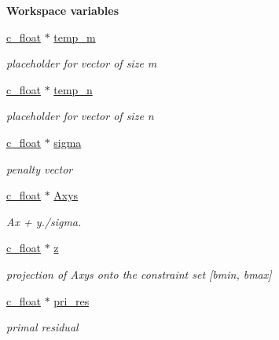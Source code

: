 \begin{Indent}\textbf{ Workspace variables}\par
\begin{DoxyCompactItemize}
\item 
\mbox{\hyperlink{global__opts_8h_a7f1a9fda95e52979658c20a0d134fb15}{c\+\_\+float}} $\ast$ \mbox{\hyperlink{structQPALMWorkspace_a43fba7da6d00e0f05d8ee75b5329f364}{temp\+\_\+m}}
\begin{DoxyCompactList}\small\item\em placeholder for vector of size m \end{DoxyCompactList}\item 
\mbox{\hyperlink{global__opts_8h_a7f1a9fda95e52979658c20a0d134fb15}{c\+\_\+float}} $\ast$ \mbox{\hyperlink{structQPALMWorkspace_af54ff24e9b647dd2d8e8df2b89c11946}{temp\+\_\+n}}
\begin{DoxyCompactList}\small\item\em placeholder for vector of size n \end{DoxyCompactList}\item 
\mbox{\hyperlink{global__opts_8h_a7f1a9fda95e52979658c20a0d134fb15}{c\+\_\+float}} $\ast$ \mbox{\hyperlink{structQPALMWorkspace_a585c53dd55cbc9aaecd42d224bde483f}{sigma}}
\begin{DoxyCompactList}\small\item\em penalty vector \end{DoxyCompactList}\item 
\mbox{\hyperlink{global__opts_8h_a7f1a9fda95e52979658c20a0d134fb15}{c\+\_\+float}} $\ast$ \mbox{\hyperlink{structQPALMWorkspace_a77e294e1afd9d2489e34fd96ef14b15a}{Axys}}
\begin{DoxyCompactList}\small\item\em Ax + y./sigma. \end{DoxyCompactList}\item 
\mbox{\hyperlink{global__opts_8h_a7f1a9fda95e52979658c20a0d134fb15}{c\+\_\+float}} $\ast$ \mbox{\hyperlink{structQPALMWorkspace_a38524247b44059e6989761d6a9159b0a}{z}}
\begin{DoxyCompactList}\small\item\em projection of Axys onto the constraint set \mbox{[}bmin, bmax\mbox{]} \end{DoxyCompactList}\item 
\mbox{\hyperlink{global__opts_8h_a7f1a9fda95e52979658c20a0d134fb15}{c\+\_\+float}} $\ast$ \mbox{\hyperlink{structQPALMWorkspace_a46bd3912583b69f83d5bd3cbb2bee8b2}{pri\+\_\+res}}
\begin{DoxyCompactList}\small\item\em primal residual \end{DoxyCompactList}\item 

\end{DoxyCompactItemize}
\end{Indent}
